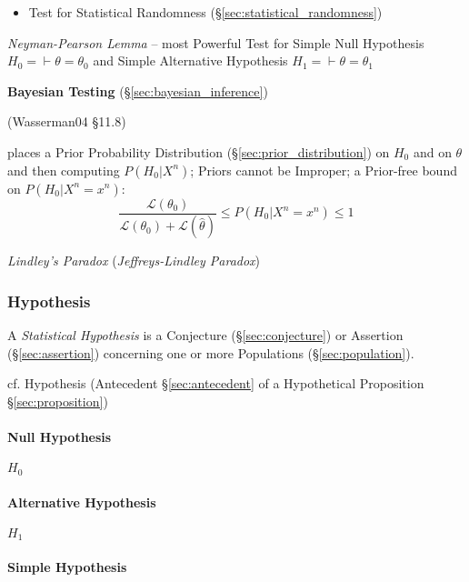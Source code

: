 \begin{itemize}
  \item Test for Statistical Randomness (\S\ref{sec:statistical_randomness})
\end{itemize}

\emph{Neyman-Pearson Lemma} -- most Powerful Test for Simple Null Hypothesis
$H_0 = \vdash \theta = \theta_0$ and Simple Alternative Hypothesis
$H_1 = \vdash \theta = \theta_1$

\asterism

\textbf{Bayesian Testing} (\S\ref{sec:bayesian_inference})

(Wasserman04 \S11.8)

places a Prior Probability Distribution (\S\ref{sec:prior_distribution}) on
$H_0$ and on $\theta$ and then computing $P(H_0 | X^n)$; Priors cannot be
Improper; a Prior-free bound on $P(H_0|X^n = x^n)$:
\[
  \frac{\mathcal{L}(\theta_0)}{\mathcal{L}(\theta_0) + \mathcal{L}(\hat\theta)}
    \leq P(H_0|X^n = x^n) \leq 1
\]

\emph{Lindley's Paradox} (\emph{Jeffreys-Lindley Paradox})



\subsubsection{Hypothesis}\label{sec:hypothesis}

A \emph{Statistical Hypothesis} is a Conjecture (\S\ref{sec:conjecture}) or
Assertion (\S\ref{sec:assertion}) concerning one or more Populations
(\S\ref{sec:population}).

cf. Hypothesis (Antecedent \S\ref{sec:antecedent} of a Hypothetical Proposition
\S\ref{sec:proposition})



\paragraph{Null Hypothesis}\label{sec:null_hypothesis}\hfill

$H_0$



\paragraph{Alternative Hypothesis}\label{sec:alternative_hypothesis}\hfill

$H_1$



\paragraph{Simple Hypothesis}\label{sec:simple_hypothesis}\hfill

